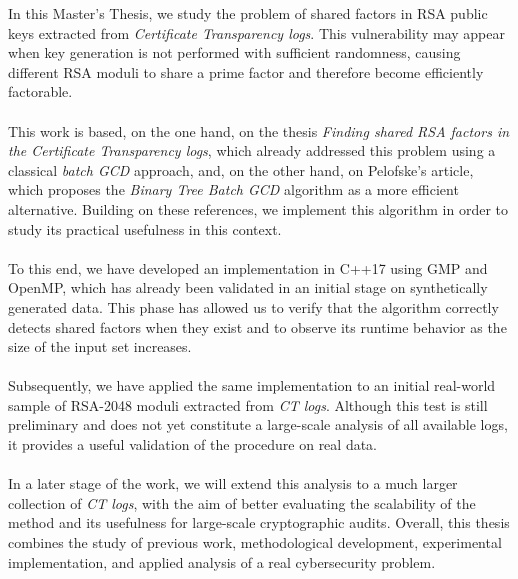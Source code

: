 In this Master's Thesis, we study the problem of shared factors in RSA public keys extracted from \textit{Certificate Transparency logs}. This vulnerability may appear when key generation is not performed with sufficient randomness, causing different RSA moduli to share a prime factor and therefore become efficiently factorable.
\\
\\
This work is based, on the one hand, on the thesis \textit{Finding shared RSA factors in the Certificate Transparency logs}, which already addressed this problem using a classical \textit{batch GCD} approach, and, on the other hand, on Pelofske's article, which proposes the \textit{Binary Tree Batch GCD} algorithm as a more efficient alternative. Building on these references, we implement this algorithm in order to study its practical usefulness in this context.
\\
\\
To this end, we have developed an implementation in C++17 using GMP and OpenMP, which has already been validated in an initial stage on synthetically generated data. This phase has allowed us to verify that the algorithm correctly detects shared factors when they exist and to observe its runtime behavior as the size of the input set increases.
\\
\\
Subsequently, we have applied the same implementation to an initial real-world sample of RSA-2048 moduli extracted from \textit{CT logs}. Although this test is still preliminary and does not yet constitute a large-scale analysis of all available logs, it provides a useful validation of the procedure on real data.
\\
\\
In a later stage of the work, we will extend this analysis to a much larger collection of \textit{CT logs}, with the aim of better evaluating the scalability of the method and its usefulness for large-scale cryptographic audits. Overall, this thesis combines the study of previous work, methodological development, experimental implementation, and applied analysis of a real cybersecurity problem.